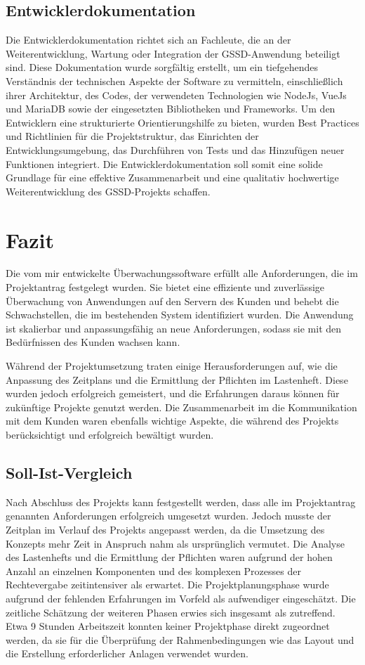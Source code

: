 \begin{flushleft}
	\subsection{Entwicklerdokumentation}
	Die Entwicklerdokumentation richtet sich an Fachleute, die an der Weiterentwicklung, Wartung oder Integration der \acs{GSSD}-Anwendung beteiligt sind. Diese Dokumentation wurde sorgfältig erstellt, um ein tiefgehendes Verständnis der technischen Aspekte der Software zu vermitteln, einschließlich ihrer Architektur, des Codes, der verwendeten Technologien wie NodeJs, VueJs und MariaDB sowie der eingesetzten Bibliotheken und Frameworks. Um den Entwicklern eine strukturierte Orientierungshilfe zu bieten, wurden Best Practices und Richtlinien für die Projektstruktur, das Einrichten der Entwicklungsumgebung, das Durchführen von Tests und das Hinzufügen neuer Funktionen integriert. Die Entwicklerdokumentation soll somit eine solide Grundlage für eine effektive Zusammenarbeit und eine qualitativ hochwertige Weiterentwicklung des \acs{GSSD}-Projekts schaffen.


	\section{Fazit}
	Die vom mir entwickelte Überwachungssoftware erfüllt alle Anforderungen, die im Projektantrag festgelegt wurden. Sie bietet eine effiziente und zuverlässige Überwachung von Anwendungen auf den Servern des Kunden und behebt die Schwachstellen, die im bestehenden System identifiziert wurden. Die Anwendung ist skalierbar und anpassungsfähig an neue Anforderungen, sodass sie mit den Bedürfnissen des Kunden wachsen kann.

Während der Projektumsetzung traten einige Herausforderungen auf, wie die Anpassung des Zeitplans und die Ermittlung der Pflichten im Lastenheft. Diese wurden jedoch erfolgreich gemeistert, und die Erfahrungen daraus können für zukünftige Projekte genutzt werden. Die Zusammenarbeit im die Kommunikation mit dem Kunden waren ebenfalls wichtige Aspekte, die während des Projekts berücksichtigt und erfolgreich bewältigt wurden.
	\subsection{Soll-\/Ist-Vergleich}
	Nach Abschluss des Projekts kann festgestellt werden, dass alle im Projektantrag genannten Anforderungen erfolgreich umgesetzt wurden. Jedoch musste der Zeitplan im Verlauf des Projekts angepasst werden, da die Umsetzung des Konzepts mehr Zeit in Anspruch nahm als ursprünglich vermutet. Die Analyse des Lastenhefts und die Ermittlung der Pflichten waren aufgrund der hohen Anzahl an einzelnen Komponenten und des komplexen Prozesses der Rechtevergabe zeitintensiver als erwartet. Die Projektplanungsphase wurde aufgrund der fehlenden Erfahrungen im Vorfeld als aufwendiger eingeschätzt. Die zeitliche Schätzung der weiteren Phasen erwies sich
	insgesamt als zutreffend. Etwa 9 Stunden Arbeitszeit konnten keiner Projektphase direkt zugeordnet werden, da sie für die Überprüfung der Rahmenbedingungen wie das Layout und die Erstellung erforderlicher Anlagen verwendet wurden.


\end{flushleft}
